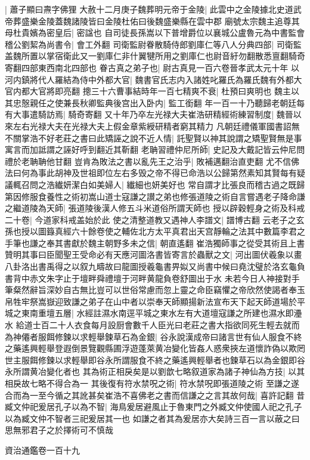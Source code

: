|{
	蕭子顯曰燾字佛狸}
大赦十二月庚子魏葬明元帝于金陵|{
	此雲中之金陵據北史道武帝葬盛樂金陵蓋魏諸陵皆曰金陵杜佑曰後魏盛樂縣在雲中郡}
廟號太宗魏主追尊其母杜貴嬪為密皇后|{
	密諡也}
自司徒長孫嵩以下普增爵位以襄城公盧魯元為中書監會稽公劉絜為尚書令|{
	會工外翻}
司衛監尉眷散騎侍郎劉庫仁等八人分典四部|{
	司衛監盖魏所置以掌宿衛此又一劉庫仁非什翼犍所用之劉庫仁也尉音紆勿翻散悉亶翻騎奇寄翻四部東西南北四部也}
眷古真之弟子也|{
	尉古真見一百六卷晉孝武太元十年}
以河内鎮將代人羅結為侍中外都大官|{
	魏書官氏志内入諸姓叱羅氏為羅氏魏有外都大官内都大官將即亮翻}
摠三十六曹事結時年一百七精爽不衰|{
	杜預曰爽明也}
魏主以其忠慤親任之使兼長秋卿監典後宫出入卧内|{
	監工銜翻}
年一百一十乃聽歸老朝廷每有大事遣騎訪焉|{
	騎奇寄翻}
又十年乃卒左光禄大夫崔浩研精經術練習制度|{
	魏晉以來左右光禄大夫在光禄大夫上假金章紫綬研精者窮其精力}
凡朝廷禮儀軍國書詔無不關掌浩不好老莊之書曰此矯誣之說不近人情|{
	託聖賢以神其說謂之矯聖賢無是事寓言而加詆謂之誣好呼到翻近其靳翻}
老聃習禮仲尼所師|{
	史記及大戴記皆云仲尼問禮於老聃聃他甘翻}
豈肯為敗法之書以亂先王之治乎|{
	敗補邁翻治直吏翻}
尤不信佛法曰何為事此胡神及世祖即位左右多毁之帝不得已命浩以公歸第然素知其賢每有疑議輒召問之浩纎妍潔白如美婦人|{
	纎細也妍美好也}
常自謂才比張良而稽古過之既歸第因修服食養性之術初嵩山道士寇謙之讃之弟也修張道陵之術自言嘗遇老子降命謙之繼道陵為天師|{
	張道陵後漢人修五斗米道俗所謂天師也}
授以辟穀輕身之術及科戒二十卷|{
	今道家科戒盖始於此}
使之清整道教又遇神人李譜文|{
	譜博古翻}
云老子之玄孫也授以圖籙真經六十餘卷使之輔佐北方太平真君出天宫靜輪之法其中數篇李君之手筆也謙之奉其書獻於魏主朝野多未之信|{
	朝直遙翻}
崔浩獨師事之從受其術且上書贊明其事曰臣聞聖王受命必有天應河圖洛書皆寄言於蟲獸之文|{
	河出圖伏羲象以畫八卦洛出書禹得之以叙九疇故曰龍圖授羲龜書畀姒又尚書中候曰堯沈璧於洛玄龜負書背中赤文朱字止于壇畔舜禮壇于河畔黄龍負卷舒圖出于水}
未若今日人神接對手筆粲然辭旨深妙自古無比豈可以世俗常慮而忽上靈之命臣竊懼之帝欣然使謁者奉玉帛牲牢祭嵩嶽迎致謙之弟子在山中者以崇奉天師顯揚新法宣布天下起天師道場於平城之東南重壇五層|{
	水經註濕水南逕平城之東水左有大道壇寇謙之所建也濕水即灅水}
給道士百二十人衣食每月設厨會數千人臣光曰老莊之書大指欲同死生輕去就而為神僊者服餌修鍊以求輕舉鍊草石為金銀|{
	谷永說漢成帝曰諸言世有仙人服食不終之藥遙興輕舉登遐倒景覽觀縣圃浮遊蓬萊黄冶變化皆姦人惑衆挾左道懷詐偽以欺罔世主服餌修鍊以求輕舉即谷永所謂服食不終之藥遙興輕舉者也鍊草石以為金銀即谷永所謂黄冶變化者也}
其為術正相戾矣是以劉歆七略叙道家為諸子神仙為方技|{
	以其相戾故七略不得合為一}
其後復有符水禁呪之術|{
	符水禁呪即張道陵之術}
至謙之遂合而為一至今循之其訛甚矣崔浩不喜佛老之書而信謙之之言其故何哉|{
	喜許記翻}
昔臧文仲祀爰居孔子以為不智|{
	海鳥爰居避風止于魯東門之外臧文仲使國人祀之孔子以為臧文仲不智者三祀爰居其一也}
如謙之者其為爰居亦大矣詩三百一言以蔽之曰思無邪君子之於擇術可不慎哉

資治通鑑卷一百十九
